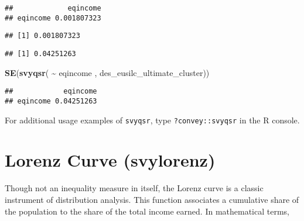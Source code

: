 \documentclass[
]{book}
\newenvironment{Shaded}{\begin{snugshade}}{\end{snugshade}}
\newcommand{\CommentTok}[1]{\textcolor[rgb]{0.56,0.35,0.01}{\textit{#1}}}
\newcommand{\FunctionTok}[1]{\textcolor[rgb]{0.13,0.29,0.53}{\textbf{#1}}}
\newcommand{\NormalTok}[1]{#1}
\newcommand{\SpecialCharTok}[1]{\textcolor[rgb]{0.81,0.36,0.00}{\textbf{#1}}}
\begin{document}
\begin{verbatim}
##             eqincome
## eqincome 0.001807323
\end{verbatim}

\begin{Shaded}
\end{Shaded}

\begin{verbatim}
## [1] 0.001807323
\end{verbatim}

\begin{Shaded}
\end{Shaded}

\begin{verbatim}
## [1] 0.04251263
\end{verbatim}

\begin{Shaded}
\begin{Highlighting}[]
\FunctionTok{SE}\NormalTok{(}\FunctionTok{svyqsr}\NormalTok{( }\SpecialCharTok{\textasciitilde{}}\NormalTok{ eqincome , des\_eusilc\_ultimate\_cluster))}
\end{Highlighting}
\end{Shaded}

\begin{verbatim}
##            eqincome
## eqincome 0.04251263
\end{verbatim}

For additional usage examples of \texttt{svyqsr}, type \texttt{?convey::svyqsr} in the R console.

\hypertarget{lorenz-curve-svylorenz}{%
\section{Lorenz Curve (svylorenz)}\label{lorenz-curve-svylorenz}}

Though not an inequality measure in itself, the Lorenz curve is a classic instrument of distribution analysis. This function associates a cumulative share of the population to the share of the total income earned. In mathematical terms,
\end{document}
